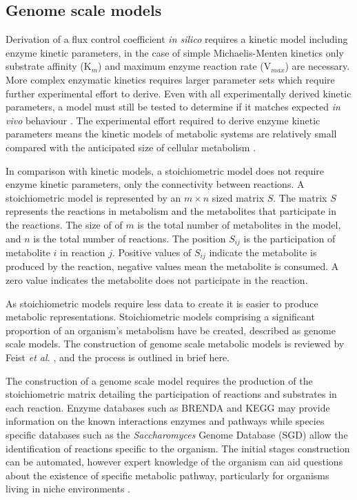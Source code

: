 
\subsection{Genome scale models}

Derivation of a flux control coefficient \emph{in silico} requires a kinetic model including enzyme kinetic parameters, in the case of simple Michaelis-Menten kinetics only substrate affinity (K$_{m}$) and maximum enzyme reaction rate (V$_{max}$) are necessary. More complex enzymatic kinetics requires larger parameter sets which require further experimental effort to derive. Even with all experimentally derived kinetic parameters, a model must still be tested to determine if it matches expected \emph{in vivo} behaviour \cite{teusink2000}. The experimental effort required to derive enzyme kinetic parameters means the kinetic models of metabolic systems are relatively small compared with the anticipated size of cellular metabolism \cite{steuer2007}.


In comparison with kinetic models, a stoichiometric model does not require enzyme kinetic parameters, only the connectivity between reactions. A stoichiometric model is represented by an $m \times n$ sized matrix $S$. The matrix $S$ represents the reactions in metabolism and the metabolites that participate in the reactions. The size of of $m$ is the total number of metabolites in the model, and $n$ is the total number of reactions. The position $S_{ij}$ is the participation of metabolite $i$ in reaction $j$. Positive values of $S_{ij}$ indicate the metabolite is produced by the reaction, negative values mean the metabolite is consumed. A zero value indicates the metabolite does not participate in the reaction.

As stoichiometric models require less data to create it is easier to produce metabolic representations. Stoichiometric models comprising a significant proportion of an organism's metabolism have be created, described as genome scale models. The construction of genome scale metabolic models is reviewed by Feist \emph{et al.} \cite{feist2009}, and the process is outlined in brief here.

The construction of a genome scale model requires the production of the stoichiometric matrix detailing the participation of reactions and substrates in each reaction. Enzyme databases such as BRENDA \cite{chang2009} and KEGG \cite{okuda2008} may provide information on the known interactions enzymes and pathways while species specific databases such as the \emph{Saccharomyces} Genome Database (SGD) \cite{cherry1997} allow the identification of reactions specific to the organism. The initial stages construction can be automated, however expert knowledge of the organism can aid questions about the existence of specific metabolic pathway, particularly for organisms living in niche environments \cite{sun2009}.

